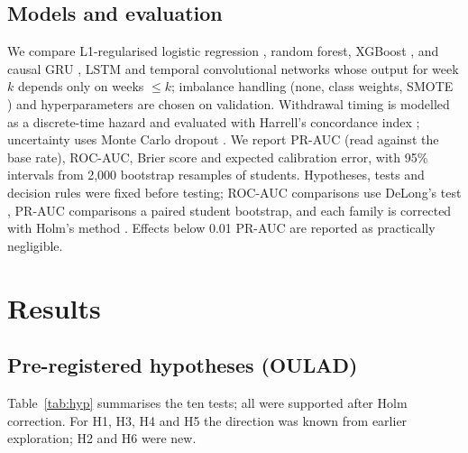 \documentclass[conference]{IEEEtran}
\begin{document}
\subsection{Models and evaluation}
We compare L1-regularised logistic regression \cite{tibshirani1996}, random forest, XGBoost \cite{chen2016}, and
causal GRU \cite{cho2014}, LSTM \cite{hochreiter1997} and temporal convolutional networks \cite{bai2018} whose
output for week $k$ depends only on weeks $\le k$; imbalance handling (none, class weights, SMOTE \cite{chawla2002})
and hyperparameters are chosen on validation. Withdrawal timing is modelled as a discrete-time hazard
\cite{singer1993} and evaluated with Harrell's concordance index \cite{harrell1982}; uncertainty uses Monte Carlo
dropout \cite{gal2016}. We report PR-AUC (read against the base rate), ROC-AUC, Brier score and expected calibration
error, with 95\% intervals from 2,000 bootstrap resamples of students. Hypotheses, tests and decision rules were
fixed before testing; ROC-AUC comparisons use DeLong's test \cite{delong1988}, PR-AUC comparisons a paired student
bootstrap, and each family is corrected with Holm's method \cite{holm1979}. Effects below 0.01 PR-AUC are reported as
practically negligible.

\section{Results}

\subsection{Pre-registered hypotheses (OULAD)}
Table~\ref{tab:hyp} summarises the ten tests; all were supported after Holm correction. For H1, H3, H4 and H5 the
direction was known from earlier exploration; H2 and H6 were new.
\end{document}
